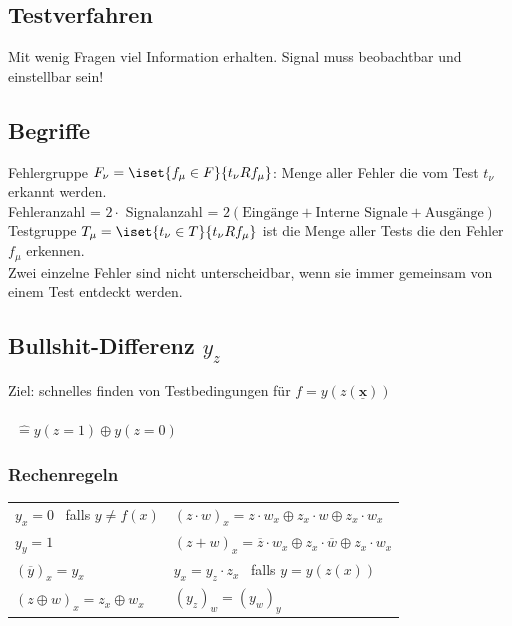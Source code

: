 \documentclass[6pt,a4paper]{scrartcl}
\renewcommand{\vec}[1]{\ensuremath{\underline{\boldsymbol {#1}}}}
\renewcommand{\vec}[1]{\ensuremath{\underline{\boldsymbol {#1}}}}
\begin{document}
\begin{multicols}{3}
\section{Testverfahren}
Mit wenig Fragen viel Information erhalten. Signal muss beobachtbar und einstellbar sein!\\

	\subsection{Begriffe}
	Fehlergruppe $F_\nu = \iset{f_\mu \in F}{t_\nu R f_\mu}$: Menge aller Fehler die vom Test $t_\nu$ erkannt werden.\\
	Fehleranzahl = $2 \cdot$ Signalanzahl = $2 (\text{Eingänge} + \text{Interne Signale} + \text{Ausgänge})$\\
	Testgruppe $T_\mu = \iset{t_\nu \in T}{t_\nu R f_\mu}$ ist die Menge aller Tests die den Fehler $f_\mu$ erkennen.\\

	Zwei einzelne Fehler sind nicht unterscheidbar, wenn sie immer gemeinsam von einem Test entdeckt werden.\\ 

	\subsection{Bullshit-Differenz $y_z$}
	Ziel: schnelles finden von Testbedingungen für $f = y(z(\vec x))$\\
	\\
	\boxed{ y_z = y(z,\vec x) \oplus y(\overline z, \vec x) } \ $\mathrel{\widehat{=}} y(z = 1) \oplus y(z=0)$\\
	
	\subsubsection{Rechenregeln}
	\begin{tabular}{ll}
		$y_x = 0$ \ falls $y \ne f(x)$ & $(z \cdot w)_x = z \cdot w_x \oplus z_x \cdot w \oplus z_x \cdot w_x$\\ 
		$y_y =1$ & $(z + w)_x = \overline z \cdot w_x \oplus z_x \cdot \overline w \oplus z_x \cdot w_x$\\
		$(\overline y)_x = y_x$ & $y_x = y_z \cdot z_x$ \ falls $y = y(z(x))$\\
		$(z \oplus w)_x = z_x \oplus w_x$ & $(y_z)_w = (y_w)_y$\\
	\end{tabular}

\end{multicols}
\end{document}
